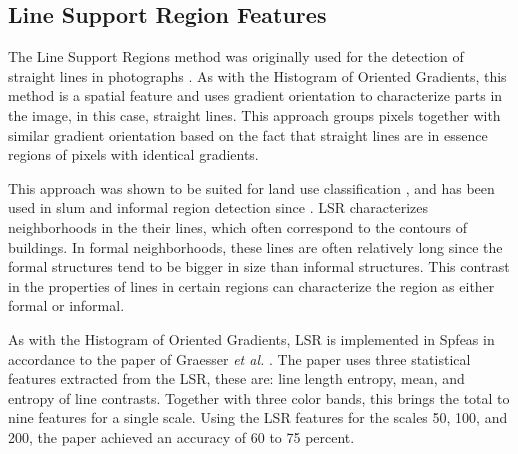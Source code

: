 %
%
%





\subsection{Line Support Region Features}

The Line Support Regions method was originally used for the detection of straight lines in photographs \cite{burns1986extracting}. As with the Histogram of Oriented Gradients, this method is a spatial feature and uses gradient orientation to characterize parts in the image, in this case, straight lines. This approach groups pixels together with similar gradient orientation based on the fact that straight lines are in essence regions of pixels with identical gradients. 

This approach was shown to be suited for land use classification \cite{unsalan2004classifying} \cite{unsalan2006gradient}, and has been used in slum and informal region detection since \cite{graesser2012image} \cite{accra} \cite{colombo}. LSR characterizes neighborhoods in the their lines, which often correspond to the contours of buildings. In formal neighborhoods, these lines are often relatively long since the formal structures tend to be bigger in size than informal structures. This contrast in the properties of lines in certain regions can characterize the region as either formal or informal.

As with the Histogram of Oriented Gradients, LSR is implemented in Spfeas in accordance to the paper of Graesser \textit{et al.} \cite{graesser2012image}. The paper uses three statistical features extracted from the LSR, these are: line length entropy, mean, and entropy of line contrasts. Together with three color bands, this brings the total to nine features for a single scale. Using the LSR features for the scales 50, 100, and 200, the paper achieved an accuracy of 60 to 75 percent.

